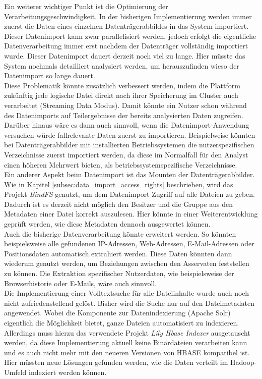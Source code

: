\noindent
Ein weiterer wichtiger Punkt ist die Optimierung der Verarbeitungsgeschwindigkeit. In der bisherigen Implementierung werden immer zuerst die Daten eines einzelnen Datenträgerabbildes in das System importiert. Dieser Datenimport kann zwar parallelisiert werden, jedoch erfolgt die eigentliche Datenverarbeitung immer erst nachdem der Datenträger vollständig importiert wurde. Dieser Datenimport dauert derzeit noch viel zu lange. Hier müsste das System nochmals detailliert analysiert werden, um herauszufinden wieso der Datenimport so lange dauert. \\
Diese Problematik könnte zusätzlich verbessert werden, indem die Plattform zukünftig jede logische Datei direkt nach ihrer Speicherung im Cluster auch verarbeitet (Streaming Data Modus). Damit könnte ein Nutzer schon während des Datenimports auf Teilergebnisse der bereits analysierten Daten zugreifen. Darüber hinaus wäre es dann auch sinnvoll, wenn die Datenimport-Anwendung versuchen würde fallrelevante Daten zuerst zu importieren. Beispielweise könnten bei Datenträgerabbilder mit installierten Betriebssystemen die nutzerspezifischen Verzeichnisse zuerst importiert werden, da diese im Normalfall für den Analyst einen höheren Mehrwert bieten, als betriebssystemspezifische Verzeichnisse.\\
Ein anderer Aspekt beim Datenimport ist das Mounten der Datenträgerabbilder. Wie in Kapitel \ref{subsec:data_import_access_rights} beschrieben, wird das Projekt \textit{BindFS} genutzt, um dem Datenimport Zugriff auf alle Dateien zu geben. Dadurch ist es derzeit nicht möglich den Besitzer und die Gruppe aus den Metadaten einer Datei korrekt auszulesen. Hier könnte in einer Weiterentwicklung geprüft werden, wie diese Metadaten dennoch ausgewertet können.\\

\noindent
Auch die bisherige Datenverarbeitung könnte erweitert werden. So könnten beispielsweise alle gefundenen IP-Adressen, Web-Adressen, E-Mail-Adressen oder Positionsdaten automatisch extrahiert werden. Diese Daten könnten dann wiederum genutzt werden, um Beziehungen zwischen den Asservaten feststellen zu können.
Die Extraktion spezifischer Nutzerdaten, wie beispielsweise der Browserhistorie oder E-Mails, wäre auch sinnvoll.\\

\noindent
Die Implementierung einer Volltextsuche für alle Dateiinhalte wurde auch noch nicht zufriedenstellend gelöst. Bisher wird die Suche nur auf den Dateimetadaten angewendet. Wobei die Komponente zur Datenindexierung (Apache Solr) eigentlich die Möglichkeit bietet, ganze Dateien automatisiert zu indexieren. Allerdings muss hierzu das verwendete Projekt \textit{Lily Hbase Indexer} ausgetauscht werden, da diese Implementierung aktuell keine Binärdateien verarbeiten kann und es auch nicht mehr mit den neueren Versionen von HBASE kompatibel ist. Hier müssten neue Lösungen gefunden werden, wie die Daten verteilt im Hadoop-Umfeld indexiert werden können.\\

